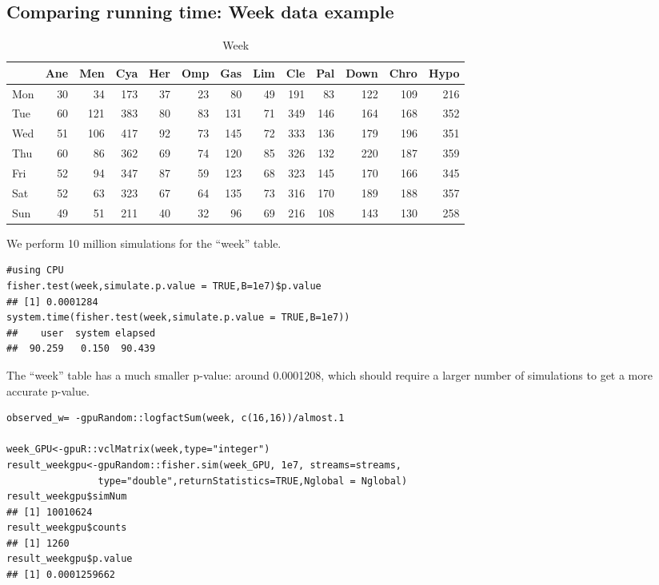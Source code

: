 \documentclass[article,nojss]{jss}\usepackage[]{graphicx}\usepackage[]{color}
\makeatletter
\newenvironment{kframe}{%
 \def\at@end@of@kframe{}%
 \ifinner\ifhmode%
  \def\at@end@of@kframe{\end{minipage}}%
  \begin{minipage}{\columnwidth}%
 \fi\fi%
 \def\FrameCommand##1{\hskip\@totalleftmargin \hskip-\fboxsep
 \colorbox{shadecolor}{##1}\hskip-\fboxsep
     \hskip-\linewidth \hskip-\@totalleftmargin \hskip\columnwidth}%
 \MakeFramed {\advance\hsize-\width
   \@totalleftmargin\z@ \linewidth\hsize
   \@setminipage}}%
 {\par\unskip\endMakeFramed%
 \at@end@of@kframe}
\newenvironment{knitrout}{}{} %
\makeatother
\begin{document}
\subsection{Comparing running time: Week data example}


\begin{knitrout}
\color{fgcolor}\begin{table}[H]

\caption{\label{tab:weekdata}Week\label{tab:week}}
\centering
\begin{tabular}[t]{l|r|r|r|r|r|r|r|r|r|r|r|r}
\hline
  & Ane & Men & Cya & Her & Omp & Gas & Lim & Cle & Pal & Down & Chro & Hypo\\
\hline
Mon & 30 & 34 & 173 & 37 & 23 & 80 & 49 & 191 & 83 & 122 & 109 & 216\\
\hline
Tue & 60 & 121 & 383 & 80 & 83 & 131 & 71 & 349 & 146 & 164 & 168 & 352\\
\hline
Wed & 51 & 106 & 417 & 92 & 73 & 145 & 72 & 333 & 136 & 179 & 196 & 351\\
\hline
Thu & 60 & 86 & 362 & 69 & 74 & 120 & 85 & 326 & 132 & 220 & 187 & 359\\
\hline
Fri & 52 & 94 & 347 & 87 & 59 & 123 & 68 & 323 & 145 & 170 & 166 & 345\\
\hline
Sat & 52 & 63 & 323 & 67 & 64 & 135 & 73 & 316 & 170 & 189 & 188 & 357\\
\hline
Sun & 49 & 51 & 211 & 40 & 32 & 96 & 69 & 216 & 108 & 143 & 130 & 258\\
\hline
\end{tabular}
\end{table}

\end{knitrout}
We perform 10 million simulations for the ``week'' table.
\begin{knitrout}
\color{fgcolor}\begin{kframe}
\begin{verbatim}
#using CPU
fisher.test(week,simulate.p.value = TRUE,B=1e7)$p.value
## [1] 0.0001284
system.time(fisher.test(week,simulate.p.value = TRUE,B=1e7))
##    user  system elapsed 
##  90.259   0.150  90.439
\end{verbatim}
\end{kframe}
\end{knitrout}
The ``week'' table has a much smaller p-value: around 0.0001208, which should require a larger number of simulations to get a more accurate p-value.
\begin{knitrout}
\color{fgcolor}\begin{kframe}
\begin{verbatim}
observed_w= -gpuRandom::logfactSum(week, c(16,16))/almost.1

week_GPU<-gpuR::vclMatrix(week,type="integer")
result_weekgpu<-gpuRandom::fisher.sim(week_GPU, 1e7, streams=streams,
                type="double",returnStatistics=TRUE,Nglobal = Nglobal)
result_weekgpu$simNum
## [1] 10010624
result_weekgpu$counts
## [1] 1260
result_weekgpu$p.value
## [1] 0.0001259662
\end{verbatim}
\end{kframe}
\end{knitrout}
\end{document}
